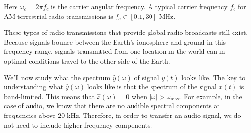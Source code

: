 Here $\omega_c=2\pi f_c$ is the carrier angular frequency. A typical
carrier frequency $f_c$ for AM terrestrial radio transmissions is
$f_c \in [0.1,30]$ MHz.

These types of radio transmissions that provide global radio
broadcasts still exist. Because signals bounce between the Earth's
ionosphere and ground in this frequency range, signals transmitted
from one location in the world can in optimal conditions travel to the
other side of the Earth.

We'll now study what the spectrum $\hat{y}(\omega)$ of signal $y(t)$
looks like. The key to understanding what $\hat{y}(\omega)$ looks like
is that the spectrum of the signal $x(t)$ is band-limited. This means
that $\hat{x}(\omega) = 0$ when $|\omega|
> \omega_{\mathrm{max}}$. For example, in the case of audio, we know
that there are no audible spectral components at frequencies above 20
kHz. Therefore, in order to transfer an audio signal, we do not need
to include higher frequency components.

